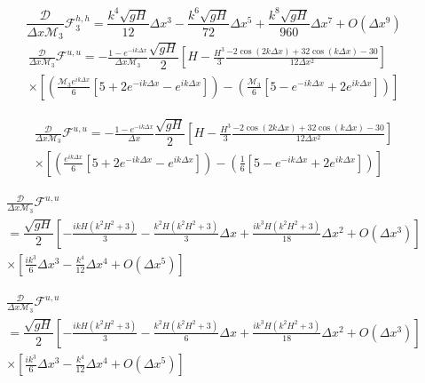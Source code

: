 \documentclass[12pt]{article}
\begin{document}
\[\frac{\mathcal{D}}{\Delta x\mathcal{M}_3}\mathcal{F}_3^{h,h} = \frac{ k^4 \sqrt{gH}}{12} \Delta x^3 - \frac{k^6 \sqrt{gH}}{72}\Delta x^5 + \frac{k^8 \sqrt{gH}}{960}\Delta x^7 + O(\Delta x ^{9})\]
\begin{multline*}
\frac{\mathcal{D}}{\Delta x\mathcal{M}_3}\mathcal{F}^{u,u} = - \frac{1 -e^{-ik\Delta x}}{\Delta x \mathcal{M}_3} \dfrac{ \sqrt{gH}}{ 2} \left[H -\frac{H^3}{3} \frac{-2\cos\left(2k\Delta x\right) + 32\cos\left(k\Delta x\right)  - 30 }{12\Delta x^2}\right] \\ \times \left [ \left(\frac{\mathcal{M}_3 e^{ik\Delta x }}{6}\left[5 + 2e^{-ik\Delta x} - e^{ik\Delta x} \right]\right)- \left(\frac{\mathcal{M}_3}{6}\left[5  - e^{-ik\Delta x} + 2e^{ik\Delta x} \right]\right) \right ]
\end{multline*}

\begin{multline*}
\frac{\mathcal{D}}{\Delta x\mathcal{M}_3}\mathcal{F}^{u,u} = - \frac{1 -e^{-ik\Delta x}}{\Delta x} \dfrac{ \sqrt{gH}}{ 2} \left[H -\frac{H^3}{3} \frac{-2\cos\left(2k\Delta x\right) + 32\cos\left(k\Delta x\right)  - 30 }{12\Delta x^2}\right] \\ \times \left [ \left(\frac{e^{ik\Delta x }}{6}\left[5 + 2e^{-ik\Delta x} - e^{ik\Delta x} \right]\right)- \left(\frac{1}{6}\left[5  - e^{-ik\Delta x} + 2e^{ik\Delta x} \right]\right) \right ]
\end{multline*}

\begin{multline*}
\frac{\mathcal{D}}{\Delta x\mathcal{M}_3}\mathcal{F}^{u,u} \\ = \dfrac{ \sqrt{gH}}{ 2} \left[-\frac{ikH\left(k^2H^2 + 3\right)}{3} - \frac{k^2H\left(k^2H^2 + 3\right)}{3} \Delta x + \frac{ik^3H\left(k^2H^2 + 3\right)}{18} \Delta x^2 + O(\Delta x^3)\right] \\ \times \left [ \frac{ik^3}{6} \Delta x^3 - \frac{k^4}{12} \Delta x^4 + O(\Delta x ^5) \right ]
\end{multline*}

\begin{multline*}
\frac{\mathcal{D}}{\Delta x\mathcal{M}_3}\mathcal{F}^{u,u} \\ = \dfrac{ \sqrt{gH}}{ 2} \left[-\frac{ikH\left(k^2H^2 + 3\right)}{3} - \frac{k^2H\left(k^2H^2 + 3\right)}{6} \Delta x + \frac{ik^3H\left(k^2H^2 + 3\right)}{18} \Delta x^2 + O(\Delta x^3)\right] \\ \times \left [ \frac{ik^3}{6} \Delta x^3 - \frac{k^4}{12} \Delta x^4 + O(\Delta x ^5) \right ]
\end{multline*}
\end{document}
